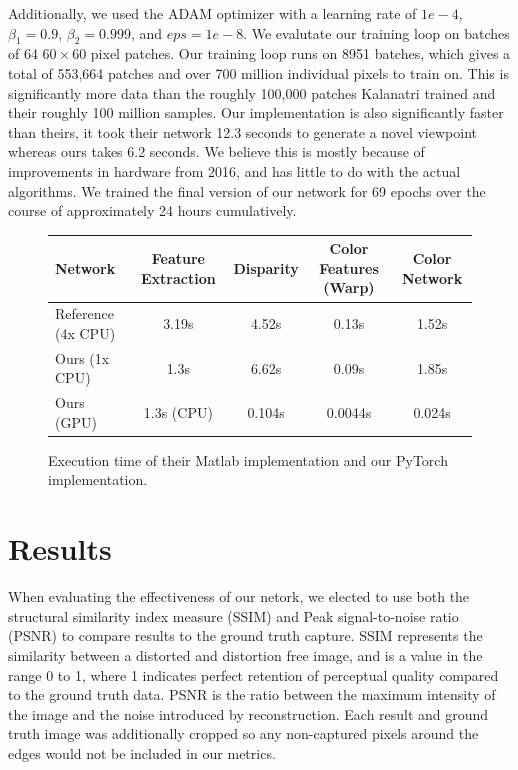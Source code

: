 \documentclass[10pt,twocolumn,letterpaper]{article}
\begin{document}
Additionally, we used the ADAM optimizer with a learning rate of $1e-4$, $\beta_1 = 0.9$, $\beta_2 = 0.999$, and $eps = 1e-8$.
We evalutate our training loop on batches of 64 $60 \times 60$ pixel patches. 
Our training loop runs on 8951 batches, which gives a total of 553,664 patches and over 700 million
individual pixels to train on. 
This is significantly more data than the roughly 100,000 patches Kalanatri \etal trained and their roughly 100 million samples.
Our implementation is also significantly faster than theirs, it took their network 12.3 seconds to generate a novel viewpoint
whereas ours takes 6.2 seconds. We believe this is mostly because of improvements in hardware from 2016, and has little to do with the
actual algorithms. We trained the final version of our network for 69 epochs over the course of approximately 24 hours cumulatively.

\begin{figure}
\begin{center}
\begin{tabular}{|l | c c c c|}
    \hline
    Network & Feature Extraction & Disparity & Color Features (Warp) & Color Network \\ \hline
    Reference (4x CPU) & 3.19s & 4.52s & 0.13s & 1.52s \\
    Ours (1x CPU) & 1.3s & 6.62s & 0.09s & 1.85s \\
    Ours (GPU) & 1.3s (CPU) & 0.104s & 0.0044s & 0.024s \\ \hline
\end{tabular}
\caption{Execution time of their Matlab implementation and our PyTorch implementation.}
\end{center}
\end{figure}


\section{Results}

When evaluating the effectiveness of our netork, we elected to use both the structural similarity index measure (SSIM)
and Peak signal-to-noise ratio (PSNR) to compare results to the ground truth capture. SSIM represents the similarity
between a distorted and distortion free image, and is a value in the range 0 to 1, where 1 indicates perfect retention
of perceptual quality compared to the ground truth data. PSNR is the ratio between the maximum intensity of the image
and the noise introduced by reconstruction. Each result and ground truth image was additionally cropped so any
non-captured pixels around the edges would not be included in our metrics.
\end{document}
